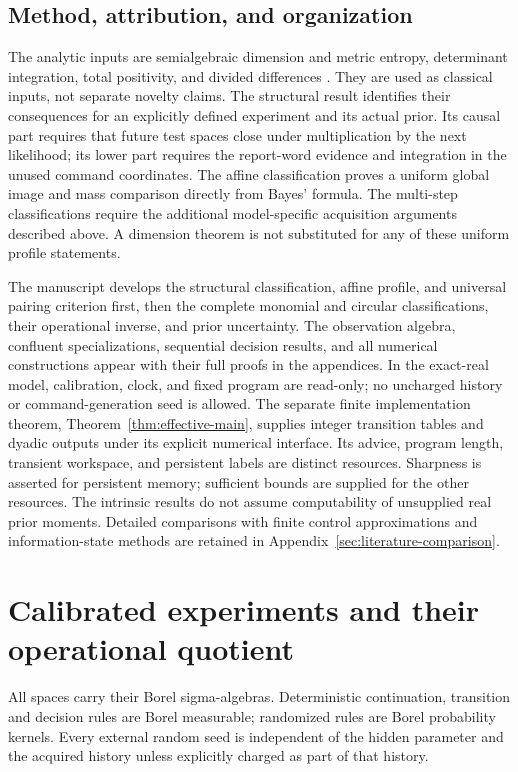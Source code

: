 \documentclass[11pt]{amsart}
\theoremstyle{definition}\newtheorem{definition}[theorem]{Definition}
\theoremstyle{remark}\newtheorem{remark}[theorem]{Remark}
\begin{document}
\subsection{Method, attribution, and organization}
The analytic inputs are semialgebraic dimension and metric entropy,
determinant integration, total positivity, and divided differences
\cite{BochnakCosteRoy,ForresterAndreief,Pinkus,deBoor,
YomdinComte,ZhangKileel,ComteHalupczok}. They are used as classical
inputs, not separate novelty claims. The structural result identifies
their consequences for an explicitly defined experiment and its actual
prior. Its causal part requires that future test spaces close under
multiplication by the next likelihood; its lower part requires the
report-word evidence and integration in the unused command coordinates.
The affine classification proves a uniform global image and mass
comparison directly from Bayes' formula. The multi-step classifications
require the additional model-specific acquisition arguments described
above. A dimension theorem is not substituted for any of these uniform
profile statements.

The manuscript develops the structural classification, affine profile,
and universal pairing criterion first, then the complete monomial and
circular classifications, their operational inverse, and prior
uncertainty. The observation algebra, confluent specializations,
sequential decision results, and all numerical constructions appear
with their full proofs in the appendices. In the exact-real model,
calibration, clock, and fixed program are read-only; no uncharged
history or command-generation seed is allowed. The separate finite
implementation theorem, Theorem~\ref{thm:effective-main}, supplies
integer transition tables and dyadic outputs under its explicit
numerical interface. Its advice, program length, transient workspace,
and persistent labels are distinct resources. Sharpness is asserted
for persistent memory; sufficient bounds are supplied for the other
resources. The intrinsic results do not assume computability of
unsupplied real prior moments. Detailed comparisons with finite
control approximations and information-state methods are retained in
Appendix~\ref{sec:literature-comparison}.

\section{Calibrated experiments and their operational quotient}\label{sec:experiment}
All spaces carry their Borel sigma-algebras. Deterministic continuation,
transition and decision rules are Borel measurable; randomized rules are
Borel probability kernels. Every external random seed is independent of
the hidden parameter and the acquired history unless explicitly charged
as part of that history.
\end{document}
